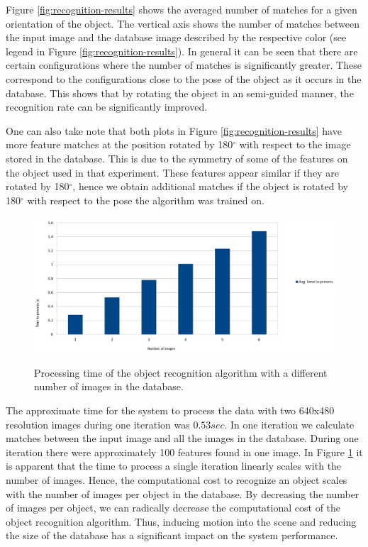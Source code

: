 Figure \ref{fig:recognition-results} shows the averaged number of matches for a given orientation of the object. The vertical axis shows the number of matches between the input image and the database image described by the respective color (see legend in Figure \ref{fig:recognition-results}). In general it can be seen that there are certain configurations where the number of matches is significantly greater. These correspond to the configurations close to the pose of the object as it occurs in the database. This shows that by rotating the object in an semi-guided manner, the recognition rate can be significantly improved. 

One can also take note that both plots in Figure \ref{fig:recognition-results} have more feature matches at the position rotated by 180$^\circ$ with respect to the image stored in the database. This is due to the symmetry of some of the features on the object used in that experiment. These features appear similar if they are rotated by 180$^\circ$, hence we obtain additional matches if the object is rotated by 180$^\circ$ with respect to the pose the algorithm was trained on.

\begin{figure}
\centering 

\includegraphics[width=1.2\columnwidth]{figures/thesis-time.png}\\


\caption{Processing time of the object recognition algorithm with a different number of images in the database.}
\label{fig:recognition-time}
\end{figure}

The approximate time for the system to process the data with two 640x480 resolution images during one iteration was $0.53 sec$. In one iteration we calculate matches between the input image and all the images in the database. During one iteration there were approximately 100 features found in one image. In Figure \ref{fig:recognition-time} it is apparent that the time to process a single iteration linearly scales with the number of images. Hence, the computational cost to recognize an object scales with the number of images per object in the database. By decreasing the number of images per object, we can radically decrease the computational cost of the object recognition algorithm. 
Thus, inducing motion into the scene and reducing the size of the database has a significant impact on the system performance.

